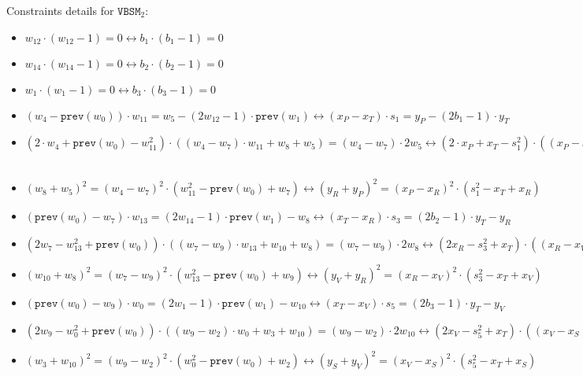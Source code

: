 Constraints details for $\texttt{VBSM}_2$:
\begin{itemize}
    \item $w_{12} \cdot (w_{12} - 1) = 0
    			\longleftrightarrow
    			b_1 \cdot (b_1 - 1) = 0$
    \item $w_{14} \cdot (w_{14} - 1) = 0
    			\longleftrightarrow
    			b_2 \cdot (b_2 - 1) = 0$
    \item $w_1 \cdot (w_1 - 1) = 0
    			\longleftrightarrow
    			b_3 \cdot (b_3 - 1) = 0$
    \item $(w_{4} - \texttt{prev}(w_{0})) \cdot w_{11} = w_5 - (2w_{12} - 1) \cdot \texttt{prev}(w_{1})
    			\longleftrightarrow
    			(x_P - x_T) \cdot s_1 = y_P - (2b_1 - 1) \cdot y_T$
    \item $(2 \cdot w_{4} + \texttt{prev}(w_{0}) - w_{11}^2) \cdot ((w_{4} - w_7) \cdot w_{11} + w_8 + w_5) = (w_{4} - w_7) \cdot 2w_5
    			\longleftrightarrow
    			(2 \cdot x_P + x_T - s_1^2) \cdot ((x_P - x_R) \cdot s_1 + y_R + y_P) = (x_P - x_R) \cdot 2y_P$\
    \item $(w_8 + w_5)^2 = (w_{4} - w_7)^2 \cdot (w_{11}^2 - \texttt{prev}(w_{0}) + w_7)
    			\longleftrightarrow
    			(y_R + y_P)^2 = (x_P - x_R)^2 \cdot (s_1^2 - x_T + x_R)$
    \item $(\texttt{prev}(w_{0}) - w_7) \cdot w_{13} = (2w_{14} - 1) \cdot \texttt{prev}(w_{1}) - w_8
    			\longleftrightarrow
    			(x_T - x_R) \cdot s_3 = (2b_2 - 1) \cdot y_T - y_R$
    \item $(2w_7 - w_{13}^2 + \texttt{prev}(w_{0})) \cdot ((w_7 - w_9) \cdot w_{13} + w_{10} + w_8) = (w_7 - w_9) \cdot 2w_8
    			\longleftrightarrow
    			(2x_R - s_3^2 + x_T) \cdot ((x_R - x_V) \cdot s_3 + y_V + y_R) = (x_R - x_V) \cdot 2y_R$
    \item $(w_{10} + w_8)^2 = (w_7 - w_9)^2 \cdot (w_{13}^2 - \texttt{prev}(w_{0}) + w_9)
    			\longleftrightarrow
    			(y_V + y_R)^2 = (x_R - x_V)^2 \cdot (s_3^2 - x_T + x_V)$
    \item $(\texttt{prev}(w_{0}) - w_9) \cdot w_0 = (2w_1 - 1) \cdot \texttt{prev}(w_{1}) - w_{10}
    			\longleftrightarrow
    			(x_T - x_V) \cdot s_5 = (2b_3 - 1) \cdot y_T - y_V$
    \item $(2w_9 - w_0^2 + \texttt{prev}(w_{0})) \cdot ((w_9 - w_2) \cdot w_0 + w_{3} + w_{10}) = (w_9 - w_2) \cdot 2w_{10}
    			\longleftrightarrow
    			(2x_V - s_5^2 + x_T) \cdot ((x_V - x_S) \cdot s_5 + y_S + y_V) = (x_V - x_S) \cdot 2y_V$
    \item $(w_{3} + w_{10})^2 = (w_9 - w_2)^2 \cdot (w_0^2 - \texttt{prev}(w_{0}) + w_2)
    			\longleftrightarrow
    			(y_S + y_V)^2 = (x_V - x_S)^2 \cdot (s_5^2 - x_T + x_S)$
\end{itemize}

